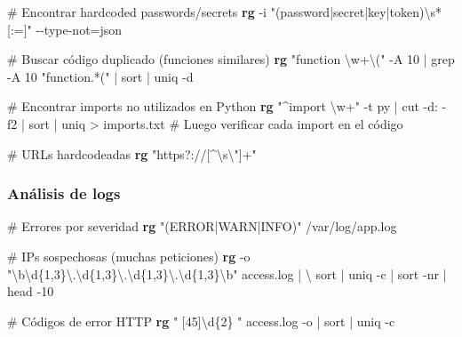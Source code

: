 \documentclass[
  11pt,
  letterpaper,
  oneside,
  openany]{scrbook}
\newenvironment{Shaded}{}{}
\newcommand{\AttributeTok}[1]{\textcolor[rgb]{0.84,0.23,0.29}{#1}}
\newcommand{\CommentTok}[1]{\textcolor[rgb]{0.42,0.45,0.49}{#1}}
\newcommand{\DataTypeTok}[1]{\textcolor[rgb]{0.84,0.23,0.29}{#1}}
\newcommand{\ExtensionTok}[1]{\textcolor[rgb]{0.84,0.23,0.29}{\textbf{#1}}}
\newcommand{\FunctionTok}[1]{\textcolor[rgb]{0.44,0.26,0.76}{#1}}
\newcommand{\KeywordTok}[1]{\textcolor[rgb]{0.84,0.23,0.29}{#1}}
\newcommand{\NormalTok}[1]{\textcolor[rgb]{0.14,0.16,0.18}{#1}}
\newcommand{\OperatorTok}[1]{\textcolor[rgb]{0.14,0.16,0.18}{#1}}
\newcommand{\StringTok}[1]{\textcolor[rgb]{0.01,0.18,0.38}{#1}}
\begin{document}
\begin{Shaded}
\begin{Highlighting}[]
\CommentTok{\# Encontrar hardcoded passwords/secrets}
\ExtensionTok{rg} \AttributeTok{{-}i} \StringTok{"(password|secret|key|token)\textbackslash{}s*[:=]"} \AttributeTok{{-}{-}type{-}not}\OperatorTok{=}\NormalTok{json}

\CommentTok{\# Buscar código duplicado (funciones similares)}
\ExtensionTok{rg} \StringTok{"function \textbackslash{}w+\textbackslash{}("} \AttributeTok{{-}A}\NormalTok{ 10 }\KeywordTok{|} \FunctionTok{grep} \AttributeTok{{-}A}\NormalTok{ 10 }\StringTok{"function.*("} \KeywordTok{|} \FunctionTok{sort} \KeywordTok{|} \FunctionTok{uniq} \AttributeTok{{-}d}

\CommentTok{\# Encontrar imports no utilizados en Python}
\ExtensionTok{rg} \StringTok{"\^{}import \textbackslash{}w+"} \AttributeTok{{-}t}\NormalTok{ py }\KeywordTok{|} \FunctionTok{cut} \AttributeTok{{-}d:} \AttributeTok{{-}f2} \KeywordTok{|} \FunctionTok{sort} \KeywordTok{|} \FunctionTok{uniq} \OperatorTok{\textgreater{}}\NormalTok{ imports.txt}
\CommentTok{\# Luego verificar cada import en el código}

\CommentTok{\# URLs hardcodeadas}
\ExtensionTok{rg} \StringTok{"https?://[\^{}\textbackslash{}s}\DataTypeTok{\textbackslash{}"}\StringTok{\textquotesingle{}]+"}
\end{Highlighting}
\end{Shaded}

\subsubsection{Análisis de logs}\label{anuxe1lisis-de-logs}

\begin{Shaded}
\begin{Highlighting}[]
\CommentTok{\# Errores por severidad}
\ExtensionTok{rg} \StringTok{"(ERROR|WARN|INFO)"}\NormalTok{ /var/log/app.log}

\CommentTok{\# IPs sospechosas (muchas peticiones)}
\ExtensionTok{rg} \AttributeTok{{-}o} \StringTok{"\textbackslash{}b\textbackslash{}d\{1,3\}\textbackslash{}.\textbackslash{}d\{1,3\}\textbackslash{}.\textbackslash{}d\{1,3\}\textbackslash{}.\textbackslash{}d\{1,3\}\textbackslash{}b"}\NormalTok{ access.log }\KeywordTok{|} \DataTypeTok{\textbackslash{}}
\FunctionTok{sort} \KeywordTok{|} \FunctionTok{uniq} \AttributeTok{{-}c} \KeywordTok{|} \FunctionTok{sort} \AttributeTok{{-}nr} \KeywordTok{|} \FunctionTok{head} \AttributeTok{{-}10}

\CommentTok{\# Códigos de error HTTP}
\ExtensionTok{rg} \StringTok{" [45]\textbackslash{}d\{2\} "}\NormalTok{ access.log }\AttributeTok{{-}o} \KeywordTok{|} \FunctionTok{sort} \KeywordTok{|} \FunctionTok{uniq} \AttributeTok{{-}c}
\end{Highlighting}
\end{Shaded}
\end{document}
